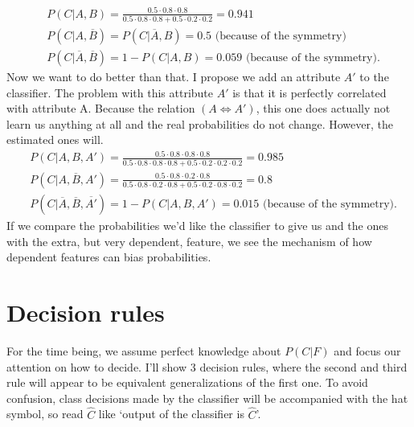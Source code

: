 \documentclass{report}
\theoremstyle{definition}
\begin{document}
\begin{equation*}
\begin{split}
& P(C|A,B)=\frac{0.5 \cdot 0.8 \cdot 0.8}{0.5 \cdot 0.8 \cdot 0.8 + 0.5 \cdot 0.2 \cdot 0.2 }= 0.941 \\
& P(C|A,\overline{B})=P(C|\overline{A},B)=0.5 \text{ (because of the symmetry) }\\
& P(C|\overline{A},\overline{B})=1- P(C|A,B)=0.059 \text{ (because of the symmetry).}
\end{split}
\end{equation*}
Now we want to do better than that. I propose we add an attribute $A'$ to the classifier. The problem with this attribute $A'$ is that it is perfectly correlated with attribute A. Because the relation $(A \Leftrightarrow A')$, this one does actually not learn us anything at all and the real probabilities do not change. However, the estimated ones will.
\begin{equation*}
\begin{split}
& P(C|A,B,A')=\frac{0.5 \cdot 0.8 \cdot 0.8 \cdot 0.8}{0.5 \cdot 0.8 \cdot 0.8 \cdot 0.8 + 0.5 \cdot 0.2 \cdot 0.2 \cdot 0.2 } = 0.985\\
& P(C|A,\overline{B},A')=\frac{0.5 \cdot 0.8 \cdot 0.2 \cdot 0.8}{0.5 \cdot 0.8 \cdot 0.2 \cdot 0.8 + 0.5 \cdot 0.2 \cdot 0.8 \cdot 0.2}=0.8\\
& P(C|\overline{A},\overline{B},\overline{A'}) = 1-P(C|A,B,A') = 0.015 \text{ (because of the symmetry).}
\end{split}
\end{equation*}
If we compare the probabilities we'd like the classifier to give us and the ones with the extra, but very dependent, feature, we see the mechanism of how dependent features can bias probabilities.

\section{Decision rules}
For the time being, we assume perfect knowledge about $P(C|F)$ and focus our attention on how to decide. I'll show 3 decision rules, where the second and third rule will appear to be equivalent generalizations of the first one. To avoid confusion, class decisions made by the classifier will be accompanied with the hat symbol, so read $\hat C$ like \lq output of the classifier is $\hat C$'.  
\end{document}
